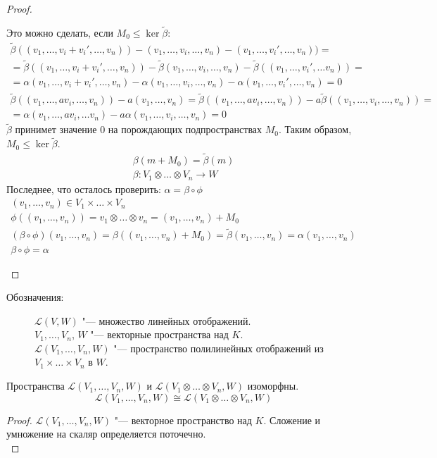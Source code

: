 \begin{description}
\begin{proof}
\begin{description}
		Это можно сделать, если $M_0 \le \ker \tilde \beta$:
		\begin{gather*}
			\tilde \beta((v_1, \dots, v_i + v_i', \dots, v_n)) - (v_1, \dots, v_i, \dots, v_n) - (v_1, \dots, v_i', \dots, v_n)) = \\
			= \tilde \beta((v_1, \dots, v_i + v_i', \dots, v_n)) - \tilde \beta(v_1, \dots, v_i, \dots, v_n)
			- \tilde \beta((v_1, \dots,v_i', \dots v_n)) = \\
			= \alpha(v_1, \dots, v_i + v_i', \dots, v_n) - \alpha(v_1, \dots, v_i, \dots, v_n) - \alpha(v_1, \dots,v_i', \dots,  v_n)
			= 0 \\
			\tilde \beta((v_1, \dots, a v_i,\dots, v_n)) - a(v_1, \dots, v_n)
			= \tilde \beta((v_1, \dots, a v_i, \dots, v_n)) - a \tilde \beta((v_1, \dots, v_i,\dots, v_n)) = \\
			= \alpha(v_1, \dots, a v_i, \dots v_n) - a\alpha(v_1, \dots, v_i, \dots, v_n)
			= 0
		\end{gather*}
		$\tilde \beta$ принимет значение 0 на порождающих подпространствах $M_0$.
		Таким образом, $M_0 \le \ker \tilde \beta$.
		\begin{gather*}
			\beta(m + M_0) = \tilde \beta(m) \\
			\beta \colon V_1 \otimes \dots \otimes V_n \to W
		\end{gather*}
		Последнее, что осталось проверить: $\alpha = \beta \circ \phi$
		\begin{gather*}
			(v_1, \dots, v_n) \in V_1 \times \dots \times V_n \\
			\phi((v_1, \dots, v_n)) = v_1 \otimes \dots \otimes v_n = (v_1, \dots, v_n) + M_0 \\
			(\beta \circ \phi)(v_1, \dots, v_n) = \beta((v_1, \dots, v_n) + M_0)
			= \tilde \beta(v_1, \dots, v_n) = \alpha(v_1, \dots, v_n) \\
			\beta \circ \phi = \alpha
		\end{gather*}
	\end{description}
	\end{proof}
        \begin{description}
        \item[Обозначения:]
        $\mathcal L(V, W)$ "--- множество линейных отображений.\\
	$V_1, \dots, V_n$, $W$ "--- векторные пространства над $K$.\\
	$\mathcal L(V_1, \dots, V_n, W)$ "--- пространство полилинейных отображений из $V_1 \times \dots \times V_n$ в $W$. \\
        \end{description}
        \begin{conseq}
		Пространства $\mathcal L(V_1, \dots, V_n, W)$ и $\mathcal L(V_1 \otimes \dots \otimes V_n, W)$ изоморфны.
		\[ \mathcal L(V_1, \dots, V_n, W) \cong \mathcal L(V_1 \otimes \dots \otimes V_n, W) \]
	\end{conseq}
	\begin{proof}
	$\mathcal L(V_1, \dots, V_n, W)$ "--- векторное пространство над $K$.
	Сложение и умножение на скаляр определяется поточечно. \\


\end{proof}
\end{description}
